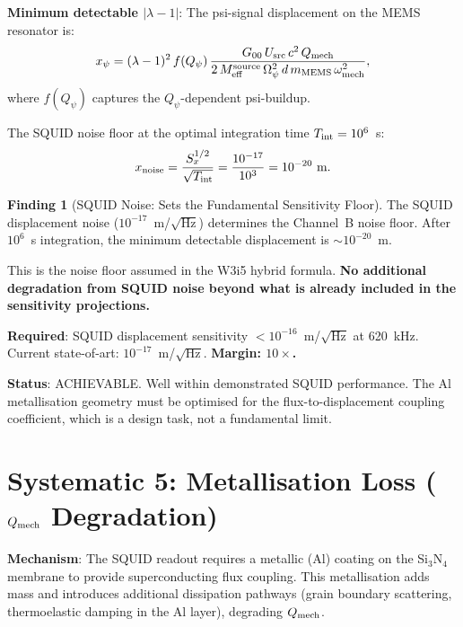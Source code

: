 \documentclass[11pt]{article}
\newcommand{\lam}{\lambda}
\newcommand{\Opsi}{\Omega_\psi}
\newcommand{\Meff}{M_{\rm eff}}
\newcommand{\Qpsi}{Q_\psi}
\newcommand{\Qmech}{Q_{\rm mech}}
\newcommand{\lbone}{|\lam - 1|}
\theoremstyle{definition}
\newtheorem{finding}[theorem]{Finding}
\theoremstyle{remark}
\begin{document}
\textbf{Minimum detectable $\lbone$}: The psi-signal displacement
on the MEMS resonator is:
\begin{equation}
x_\psi = (\lam-1)^2\,f(\Qpsi)\,\frac{G_{00}\,U_{\rm src}\,c^2\,\Qmech}
{2\,\Meff^{\rm source}\,\Opsi^2\,d\,m_{\rm MEMS}\,\omega_{\rm mech}^2},
\end{equation}
where $f(\Qpsi)$ captures the $\Qpsi$-dependent psi-buildup.

The SQUID noise floor at the optimal integration time
$T_{\rm int} = 10^6$~s:
\begin{equation}
x_{\rm noise} = \frac{S_x^{1/2}}{\sqrt{T_{\rm int}}}
= \frac{10^{-17}}{10^3} = 10^{-20}~\text{m}.
\end{equation}

\begin{finding}[SQUID Noise: Sets the Fundamental Sensitivity Floor]
\label{find:squid_noise}
The SQUID displacement noise ($10^{-17}$~m/$\sqrt{\text{Hz}}$)
determines the Channel~B noise floor. After $10^6$~s integration,
the minimum detectable displacement is $\sim 10^{-20}$~m.

This is the noise floor assumed in the W3i5 hybrid formula.
\textbf{No additional degradation from SQUID noise beyond what is
already included in the sensitivity projections.}

\textbf{Required}: SQUID displacement sensitivity
$< 10^{-16}$~m/$\sqrt{\text{Hz}}$ at 620~kHz. Current state-of-art:
$10^{-17}$~m/$\sqrt{\text{Hz}}$. \textbf{Margin: $10\times$.}

\textbf{Status}: \textcolor{strongcolor}{ACHIEVABLE. Well within
demonstrated SQUID performance. The Al metallisation geometry must be
optimised for the flux-to-displacement coupling coefficient, which
is a design task, not a fundamental limit.}
\end{finding}


\section{Systematic 5: Metallisation Loss ($\Qmech$ Degradation)}
\label{sec:metallisation}

\textbf{Mechanism}: The SQUID readout requires a metallic (Al) coating
on the Si$_3$N$_4$ membrane to provide superconducting flux coupling.
This metallisation adds mass and introduces additional dissipation
pathways (grain boundary scattering, thermoelastic damping in the Al
layer), degrading $\Qmech$.
\end{document}
